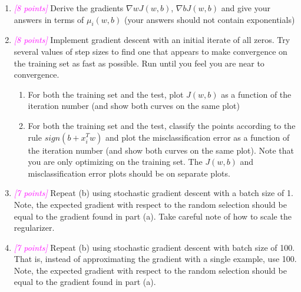 \documentclass{article}
\newcommand{\1}{\mathbf{1}}
\newcommand{\points}[1]{\small\textcolor{magenta}{\emph{[#1 points]}} \normalsize}
\begin{document}
\begin{enumerate}
    \item \points{8} Derive the gradients $\nabla wJ(w,b)$, $\nabla bJ(w,b)$ and give your answers in terms of $\mu_i(w,b)$  (your answers should not contain exponentials)
    \item \points{8} Implement gradient descent with an initial iterate of all zeros. Try several values of step sizes to find one that appears to make convergence on the training set as fast as possible. Run until you feel you are near to convergence.
    \begin{enumerate}
        \item For both the training set and the test, plot $J(w,b)$ as a function of the iteration number (and show both curves on the same plot)
        \item For both the training set and the test, classify the points according to the rule $sign(b+x^T_iw)$ and plot the misclassification error as a function of the iteration number (and show both curves on the same plot). Note that you are only optimizing on the training set. The $J(w,b)$ and misclassification error plots should be on separate plots.
    \end{enumerate}
    \item \points{7} Repeat (b) using stochastic gradient descent with a batch size of 1. Note, the expected gradient with respect to the random selection should be equal to the gradient found in part (a). Take careful note of how to scale the regularizer.
    \item \points{7} Repeat (b) using stochastic gradient descent with batch size of 100. That is, instead of approximating the gradient with a single example, use 100. Note, the expected gradient with respect to the random selection should be equal to the gradient found in part (a).
\end{enumerate}
\end{document}
